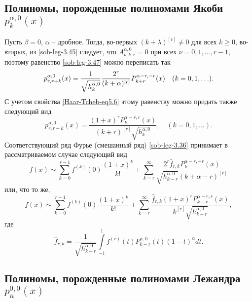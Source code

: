 \subsection{Полиномы, порожденные полиномами Якоби $p_{k}^{\alpha,0}(x)$}


 Пусть $\beta=0$, $\alpha$ -- дробное. Тогда, во-первых $(k+\lambda)^{[r]}\neq0$ для всех $k\ge0$, во-вторых,  из \eqref{sob-leg-3.45} следует, что $A_{\nu,k,r}^{\alpha,0}=0$ при всех  $\nu=0,1,\dots, r-1$, поэтому равенство
\eqref{sob-leg-3.47} можно переписать так
 \begin{equation}\label{sob-leg-3.48}
p_{r,r+k}^{\alpha,0}(x) ={1\over\sqrt{ h_k^{\alpha,0}}}
\frac{2^r}{(k+\alpha)^{[r]}}P_{k+r}^{\alpha-r,-r}(x) \quad (k=0,1,\ldots).
\end{equation}
С учетом свойства \eqref{Haar-Tcheb-eq5.6} этому равенству можно придать также следующий вид
\begin{equation}\label{sob-leg-3.49}
p_{r,r+k}^{\alpha,0}(x) =
\frac{(1+x)^rP_{k}^{\alpha-r,r}(x)}{(k+r)^{[r]}\sqrt{ h_k^{\alpha,0}}},
 \quad (k=0,1,\ldots).
\end{equation}
Соответствующий ряд Фурье (смешанный ряд) \eqref{sob-leg-3.36} принимает в рассматриваемом случае следующий вид
\begin{equation}\label{sob-leg-3.50}
f(x)\sim\sum_{k=0}^{r-1} f^{(k)}(0)\frac{(1+x)^k}{k!}+ \sum_{k=r}^\infty \frac{2^r \hat f_{r,k}P_{k}^{\alpha-r,-r}(x)}{\sqrt{h_{k-r}^{\alpha,0}}(k+\alpha-r)^{[r]}}
\end{equation}
или, что то же,
\begin{equation}\label{sob-leg-3.51}
f(x)\sim\sum_{k=0}^{r-1} f^{(k)}(0)\frac{(1+x)^k}{k!}+ \sum_{k=r}^\infty \frac{ \hat f_{r,k}(1+x)^rP_{k-r}^{\alpha-r,r}(x)}{k^{[r]}\sqrt{h_{k-r}^{\alpha,0}}},
\end{equation}
где
  \begin{equation}\label{sob-leg-3.52}
 \hat f_{r,k}=\frac{1}{\sqrt{ h_{k-r}^{\alpha,0}}}\int\limits_{-1}^1 f^{(r)}(t)P_{k-r}^{\alpha,0}(t)(1-t)^\alpha dt.
\end{equation}


\subsection{ Полиномы, порожденные полиномами Лежандра $p_{n}^{0,0}(x)$}

